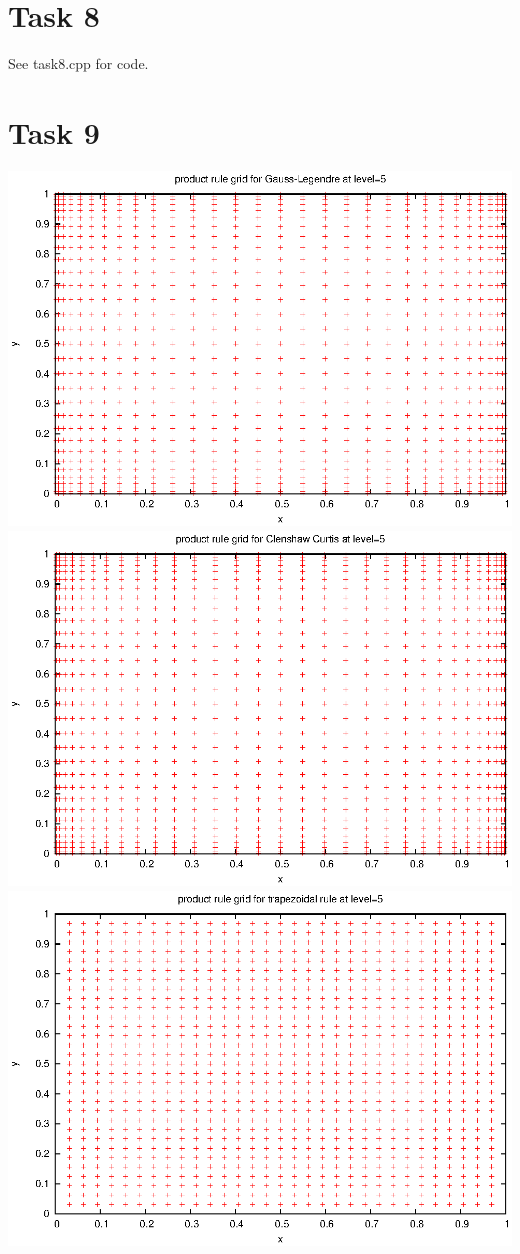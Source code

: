 \documentclass[]{article}
\begin{document}
\section*{Task 8}
See task8.cpp for code.

\section*{Task 9}
\includegraphics{task9_gauss}\\
\includegraphics{task9_cc}\\
\includegraphics{task9_trapezoidal}\\
\end{document}
